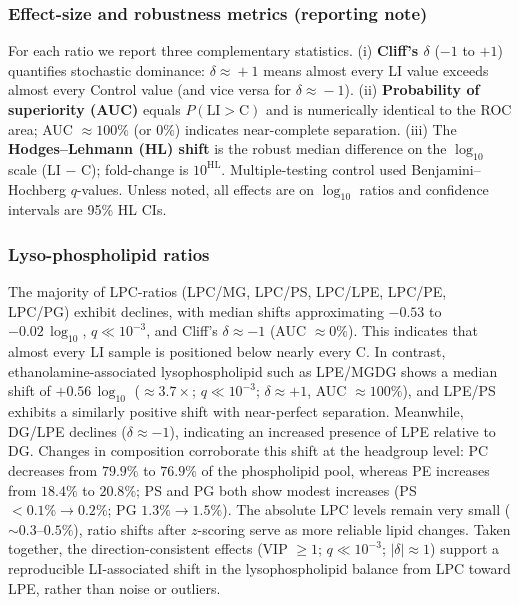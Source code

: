 \documentclass[10pt,letterpaper]{article}
\begin{document}
\subsubsection*{Effect-size and robustness metrics (reporting note)}
For each ratio we report three complementary statistics. 
(i) \textbf{Cliff's $\delta$} ($-1$ to $+1$) quantifies stochastic dominance: $\delta\!\approx\!+1$ means almost every LI value exceeds almost every Control value (and vice versa for $\delta\!\approx\!-1$). 
(ii) \textbf{Probability of superiority (AUC)} equals $P(\text{LI}>\text{C})$ and is numerically identical to the ROC area; AUC $\approx 100\%$ (or $0\%$) indicates near-complete separation. 
(iii) The \textbf{Hodges–Lehmann (HL) shift} is the robust median difference on the $\log_{10}$ scale (LI $-$ C); fold-change is $10^{\text{HL}}$. 
Multiple-testing control used Benjamini–Hochberg $q$-values.
Unless noted, all effects are on $\log_{10}$ ratios and confidence intervals are 95\% HL CIs.


\subsubsection*{Lyso-phospholipid ratios}
The majority of LPC-ratios (LPC/MG, LPC/PS, LPC/LPE, LPC/PE, LPC/PG) exhibit declines, with median shifts approximating $-0.53$ to $-0.02 \,\log_{10}$, $q \ll 10^{-3}$, and Cliff’s $\delta \approx -1$ (AUC $\approx 0\%$). This indicates that almost every LI sample is positioned below nearly every C. In contrast, ethanolamine-associated lysophospholipid such as LPE/MGDG shows a median shift of  $+0.56 \,\log_{10}$ ($\approx 3.7\times$; $q \ll 10^{-3}$; $\delta \approx +1$, AUC $\approx 100\%$), and LPE/PS exhibits a similarly positive shift with near-perfect separation. Meanwhile, DG/LPE declines ($\delta \approx -1$), indicating an increased presence of LPE relative to DG. Changes in composition corroborate this shift at the headgroup level: PC decreases from $79.9\%$ to $76.9\%$ of the phospholipid pool, whereas PE increases from $18.4\%$ to $20.8\%$; PS and PG both show modest increases (PS $<0.1\% \rightarrow 0.2\%$; PG $1.3\% \rightarrow 1.5\%$). The absolute LPC levels remain very small ($\sim 0.3$–$0.5\%$), ratio shifts after $z$-scoring serve as more reliable lipid changes. Taken together, the direction-consistent effects (VIP $\geq 1$; $q \ll 10^{-3}$; $|\delta| \approx 1$) support a reproducible LI-associated shift in the lysophospholipid balance from LPC toward LPE, rather than noise or outliers.
\end{document}
